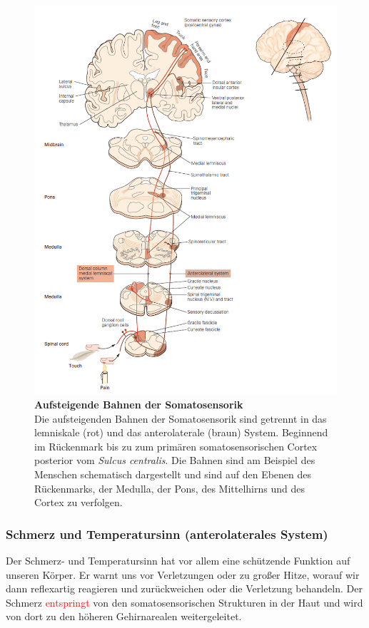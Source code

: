 \documentclass[12pt,a4paper,pdftex]{article}
\begin{document}
\begin{figure}[H]
    \centering
    \includegraphics{pictures/somatosensory/pathway_somatosensory2.png}
    \caption[Aufsteigende Bahnen der Somatosensorik]{\textbf{Aufsteigende Bahnen der Somatosensorik}\\
    Die aufsteigenden Bahnen der Somatosensorik sind getrennt in das lemniskale (rot) und das anterolaterale (braun) System. Beginnend im Rückenmark bis zu zum primären somatosensorischen Cortex posterior vom \textit{Sulcus centralis}. Die Bahnen sind am Beispiel des Menschen schematisch dargestellt und sind auf den Ebenen des Rückenmarks, der Medulla, der Pons, des Mittelhirns und des Cortex zu verfolgen. \\
    \textsuperscript{\cite[22]{kandel2013principles}}}
    \label{fig:somato_pathway}
\end{figure}

\newpage    
\subsubsection{Schmerz und Temperatursinn (anterolaterales System)}
Der Schmerz- und Temperatursinn hat vor allem eine schützende Funktion auf unseren Körper. Er warnt uns vor Verletzungen oder zu großer Hitze, worauf wir dann reflexartig reagieren und zurückweichen oder die Verletzung behandeln. Der Schmerz \textcolor{red}{entspringt} von den somatosensorischen Strukturen in der Haut und wird von dort zu den höheren Gehirnarealen weitergeleitet. 
\end{document}

